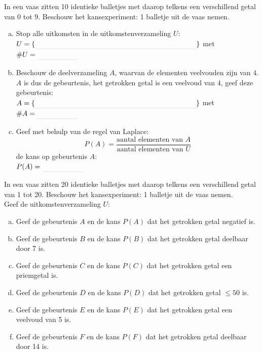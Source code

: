 \documentclass[12pt,twoside]{article}
\begin{document}
\begin{oefening}
In een vaas zitten 10 identieke balletjes met daarop telkens een verschillend getal van 0 tot 9. Beschouw het kansexperiment: 1 balletje uit de vaas nemen.
\begin{enumerate}[(a)]
  \item Stop alle uitkomsten in de uitkomstenverzameling $U$:\\
  $U=\{\arule{8cm}\}$ met $\#U=\arule{2cm}$
  \item Beschouw de deelverzameling $A$, waarvan de elementen veelvouden zijn van $4$. $A$ is dus de gebeurtenis, het getrokken getal is een veelvoud van $4$, geef deze gebeurtenis:\\
  $A=\{\arule{8cm}\}$ met $\#A=\arule{2cm}$
  \item Geef met behulp van de regel van Laplace:
  $$P(A)=\dfrac{\mbox{aantal elementen van }A}{\mbox{aantal elementen van }U}$$
  de kans op gebeurtenis $A$:\\
  $P(A)=\arule{2cm}$
\end{enumerate}
\end{oefening}
\vspace*{0.5cm}

\begin{oefening}
In een vaas zitten 20 identieke balletjes met daarop telkens een verschillend getal van 1 tot 20. Beschouw het kansexperiment: 1 balletje uit de vaas nemen.\\
Geef de uitkomstenverzameling $U$:
\begin{enumerate}[(a)]
  \item Geef de gebeurtenis $A$ en de kans $P(A)$ dat het getrokken getal negatief is.
  \item Geef de gebeurtenis $B$ en de kans $P(B)$ dat het getrokken getal deelbaar door 7 is.
  \item Geef de gebeurtenis $C$ en de kans $P(C)$ dat het getrokken getal een priemgetal is.
  \item Geef de gebeurtenis $D$ en de kans $P(D)$ dat het getrokken getal $\leq 50$ is.
  \item Geef de gebeurtenis $E$ en de kans $P(E)$ dat het getrokken getal een veelvoud van 5 is.
  \item Geef de gebeurtenis $F$ en de kans $P(F)$ dat het getrokken getal deelbaar door 14 is.
\end{enumerate}
\end{oefening}
\end{document}

